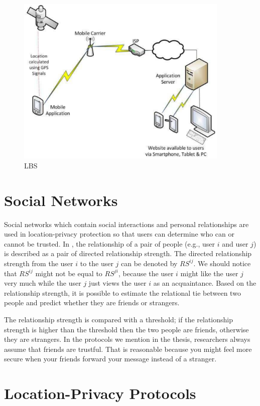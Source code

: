 \begin{figure} [H]
  \centering 
  \includegraphics[width=4.0in]{figures/FIG_LBS_11.png}
  \caption{LBS \cite {C11}} 
  \label{fig:LBS} %
\end{figure}

\section{ Social Networks}

\noindent Social networks which contain social interactions and personal relationships are used in location-privacy protection so that users can determine who can or cannot be trusted. In \cite {C30}, the relationship of a pair of people (e.g., user $i$ and user $j$) is described as a pair of directed relationship strength. The directed relationship strength from the user $i$ to the user $j$ can be denoted by ${RS}^{ij}$. We should notice that ${RS}^{ij}$ might not be equal to ${RS}^{ji}$, because the user $i$ might like the user $j$ very much while the user $j$ just views the user $i$ as an acquaintance. Based on the relationship strength, it is possible to estimate the relational tie between two people and predict whether they are friends or strangers. 

The relationship strength is compared with a threshold; if the relationship strength is higher than the threshold then the two people are friends, otherwise they are strangers. In the protocols we mention in the thesis, researchers always assume that friends are trustful. That is reasonable because you might feel more secure when your friends forward your message instead of a stranger. 


\section{ Location-Privacy Protocols}

